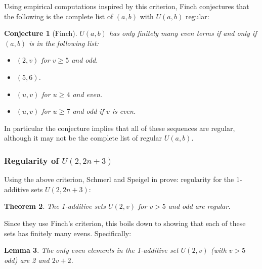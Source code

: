 \documentclass{article}
\newtheorem{theorem}{Theorem}[section]
\newtheorem{lemma}[theorem]{Lemma}
\newtheorem{conjecture}[theorem]{Conjecture}
\theoremstyle{definition}
\theoremstyle{remark}
\numberwithin{equation}{section}
\begin{document}
Using empirical computations inspired by this criterion, Finch
conjectures \cite{finch:em1992} that the following is the complete
list of $(a,b)$ with $U(a,b)$ regular:

\begin{conjecture}[Finch]
  $U(a,b)$ has only finitely many even terms if and only if $(a,b)$ is
  in the following list:

\begin{itemize}
\item $(2,v)$ for $v \geq 5$ and odd.
\item $(5,6)$.
\item $(u,v)$ for $u \geq 4$ and even.
\item $(u,v)$ for $u \geq 7$ and odd if $v$ is even.
\end{itemize}
\end{conjecture}

In particular the conjecture implies that all of these sequences are
regular, although it may not be the complete list of regular $U(a,b)$.

\subsubsection{Regularity of $U(2,2n+3)$}

Using the above criterion, Schmerl and Speigel in
\cite{schmerl:jct1994} prove: regularity for the 1-additive sets
$U(2, 2n+3)$:

\begin{theorem}
The 1-additive sets $U(2,v)$ for $v > 5$ and odd are regular.
\end{theorem}

Since they use Finch's criterion, this boils down to showing that each
of these sets has finitely many evens.  Specifically: 

\begin{lemma}The only even elements in the 1-additive set $U(2,v)$
  (with $v > 5$ odd) are 2 and $2v+2$.
\end{lemma}
\end{document}
